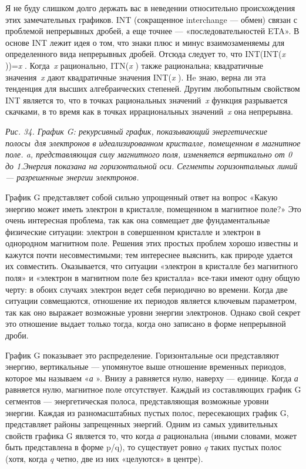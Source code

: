 Я не буду слишком долго держать вас в неведении относительно происхождения этих замечательных графиков. INT (сокращенное interchange --- обмен) связан с проблемой непрерывных дробей, а еще точнее --- «последовательностей ETA». В основе INT лежит идея о том, что знаки плюс и минус взаимозаменяемы для определенного вида непрерывных дробей. Отсюда следует то, что INT(INT(\emph{x} ))=\emph{x} . Когда~\emph{x} рационально, ITN(\emph{x} ) также рациональна; квадратичные значения~\emph{x} дают квадратичные значения INT(\emph{x} ). He знаю, верна ли эта тенденция для высших алгебраических степеней. Другим любопытным свойством INT является то, что в точках рациональных значений~\emph{x} функция разрывается скачками, в то время как в точках иррациональных значений~\emph{x} она непрерывна.

\emph{Рис. 34. График G: рекурсивный график, показывающий энергетические полосы~для электронов в идеализированном кристалле, помещенном в магнитное поле. a, представляющая силу магнитного поля, изменяется вертикально от 0 до 1.Энергия показана на горизонтальной оси. Сегменты горизонтальных линий --- разрешенные энергии электронов.}

График G представляет собой сильно упрощенный ответ на вопрос «Какую энергию может иметь электрон в кристалле, помещенном в магнитное поле?» Это очень интересная проблема, так как она совмещает две фундаментальные физические ситуации: электрон в совершенном кристалле и электрон в однородном магнитном поле. Решения этих простых проблем хорошо известны и кажутся почти несовместимыми; тем интереснее выяснить, как природе удается их совместить. Оказывается, что ситуации «электрон в кристалле без магнитного поля» и «электрон в магнитном поле без кристалла» все-таки имеют одну общую черту: в обоих случаях электрон ведет себя периодично во времени. Когда две ситуации совмещаются, отношение их периодов является ключевым параметром, так как оно выражает возможные уровни энергии электронов. Однако свой секрет это отношение выдает только тогда, когда оно записано в форме непрерывной дроби.

График G показывает это распределение. Горизонтальные оси представляют энергию, вертикальные --- упомянутое выше отношение временных периодов, которое мы называем «\emph{а} ». Внизу а равняется нулю, наверху --- единице. Когда \emph{а} равняется нулю, магнитное поле отсутствует. Каждый из составляющих график G сегментов --- энергетическая полоса, представляющая возможные уровни энергии. Каждая из разномасштабных пустых полос, пересекающих график G, представляет районы запрещенных энергий. Одним из самых удивительных свойств графика G является то, что когда \emph{а} рациональна (иными словами, может быть представлена в форме p/q), то существует ровно \emph{q} таких пустых полос (хотя, когда \emph{q} четно, две из них «целуются» в центре).

